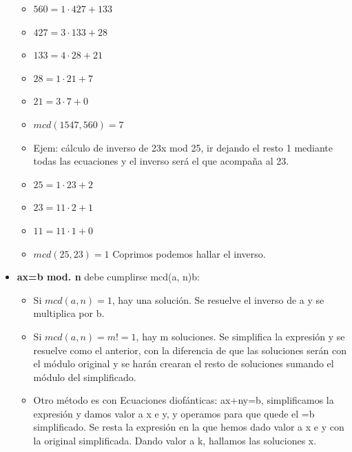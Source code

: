 \documentclass[12pt, twoside, openright]{report} %
\begin{document}
\begin{itemize}
\begin{itemize}
    \item $560 = 1 · 427 + 133$
      
    \item $427 = 3 · 133 + 28$
      
    \item $133 = 4 · 28 + 21$
      
    \item $28 = 1 · 21 + 7$
      
    \item $21 = 3 · 7 + 0$
      
    \item $mcd(1547,560) = 7$
      
    \item Ejem: cálculo de inverso de 23x mod 25, ir dejando el resto 1
      mediante todas las ecuaciones y el inverso será el que acompaña al
      23.
      
    \item $25=1·23+2$
      
    \item $23=11·2+1$
      
    \item $11=11·1+0$
      
    \item $mcd(25, 23)= 1$ Coprimos podemos hallar el inverso.
      
    \end{itemize}
  \item \textbf{ax=b mod. n} debe cumplirse mcd(a, n)\textbar b:
    

    \begin{itemize}
    \item Si $mcd(a, n)= 1$, hay una solución. Se resuelve el inverso de a y
      se multiplica por b.
      
    \item Si $mcd(a, n)=m!=1$, hay m soluciones. Se simplifica la expresión y
      se resuelve como el anterior, con la diferencia de que las
      soluciones serán con el módulo original y se harán crearan el
      resto de soluciones sumando el módulo del simplificado.
      
    \item Otro método es con Ecuaciones diofánticas: ax+ny=b, simplificamos
      la expresión y damos valor a x e y, y operamos para que quede el
      =b simplificado. Se resta la expresión en la que hemos dado valor
      a x e y con la original simplificada. Dando valor a k, hallamos
      las soluciones x.
      

\end{itemize}
\end{itemize}
\end{document}
